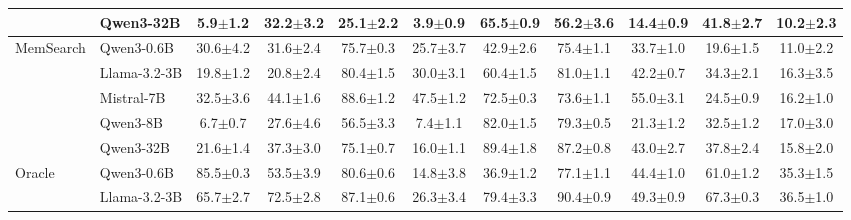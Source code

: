 \begin{table}[t]
\begin{tabular}{@{}ll ccccccccc@{}}
  & Qwen3-32B      & 5.9{\scriptsize$\pm$1.2} & 32.2{\scriptsize$\pm$3.2} & 25.1{\scriptsize$\pm$2.2} & 3.9{\scriptsize$\pm$0.9} & 65.5{\scriptsize$\pm$0.9} & 56.2{\scriptsize$\pm$3.6} & 14.4{\scriptsize$\pm$0.9} & 41.8{\scriptsize$\pm$2.7} & 10.2{\scriptsize$\pm$2.3} \\
\midrule
\multirow{5}{*}{MemSearch}
  & Qwen3-0.6B     & 30.6{\scriptsize$\pm$4.2} & 31.6{\scriptsize$\pm$2.4} & 75.7{\scriptsize$\pm$0.3} & 25.7{\scriptsize$\pm$3.7} & 42.9{\scriptsize$\pm$2.6} & 75.4{\scriptsize$\pm$1.1} & 33.7{\scriptsize$\pm$1.0} & 19.6{\scriptsize$\pm$1.5} & 11.0{\scriptsize$\pm$2.2} \\

  & Llama-3.2-3B   & 19.8{\scriptsize$\pm$1.2} & 20.8{\scriptsize$\pm$2.4} & 80.4{\scriptsize$\pm$1.5} & 30.0{\scriptsize$\pm$3.1} & 60.4{\scriptsize$\pm$1.5} & 81.0{\scriptsize$\pm$1.1} & 42.2{\scriptsize$\pm$0.7} & 34.3{\scriptsize$\pm$2.1} & 16.3{\scriptsize$\pm$3.5} \\

  & Mistral-7B     & 32.5{\scriptsize$\pm$3.6} & 44.1{\scriptsize$\pm$1.6} & 88.6{\scriptsize$\pm$1.2} & 47.5{\scriptsize$\pm$1.2} & 72.5{\scriptsize$\pm$0.3} & 73.6{\scriptsize$\pm$1.1} & 55.0{\scriptsize$\pm$3.1} & 24.5{\scriptsize$\pm$0.9} & 16.2{\scriptsize$\pm$1.0} \\

  & Qwen3-8B       & 6.7{\scriptsize$\pm$0.7} & 27.6{\scriptsize$\pm$4.6} & 56.5{\scriptsize$\pm$3.3} & 7.4{\scriptsize$\pm$1.1} & 82.0{\scriptsize$\pm$1.5} & 79.3{\scriptsize$\pm$0.5} & 21.3{\scriptsize$\pm$1.2} & 32.5{\scriptsize$\pm$1.2} & 17.0{\scriptsize$\pm$3.0} \\

  & Qwen3-32B      & 21.6{\scriptsize$\pm$1.4} & 37.3{\scriptsize$\pm$3.0} & 75.1{\scriptsize$\pm$0.7} & 16.0{\scriptsize$\pm$1.1} & 89.4{\scriptsize$\pm$1.8} & 87.2{\scriptsize$\pm$0.8} & 43.0{\scriptsize$\pm$2.7} & 37.8{\scriptsize$\pm$2.4} & 15.8{\scriptsize$\pm$2.0} \\
\midrule
\multirow{5}{*}{Oracle}
  & Qwen3-0.6B     & 85.5{\scriptsize$\pm$0.3} & 53.5{\scriptsize$\pm$3.9} & 80.6{\scriptsize$\pm$0.6} & 14.8{\scriptsize$\pm$3.8} & 36.9{\scriptsize$\pm$1.2} & 77.1{\scriptsize$\pm$1.1} & 44.4{\scriptsize$\pm$1.0} & 61.0{\scriptsize$\pm$1.2} & 35.3{\scriptsize$\pm$1.5} \\

  & Llama-3.2-3B   & 65.7{\scriptsize$\pm$2.7} & 72.5{\scriptsize$\pm$2.8} & 87.1{\scriptsize$\pm$0.6} & 26.3{\scriptsize$\pm$3.4} & 79.4{\scriptsize$\pm$3.3} & 90.4{\scriptsize$\pm$0.9} & 49.3{\scriptsize$\pm$0.9} & 67.3{\scriptsize$\pm$0.3} & 36.5{\scriptsize$\pm$1.0} \\


\end{tabular}
\end{table}

